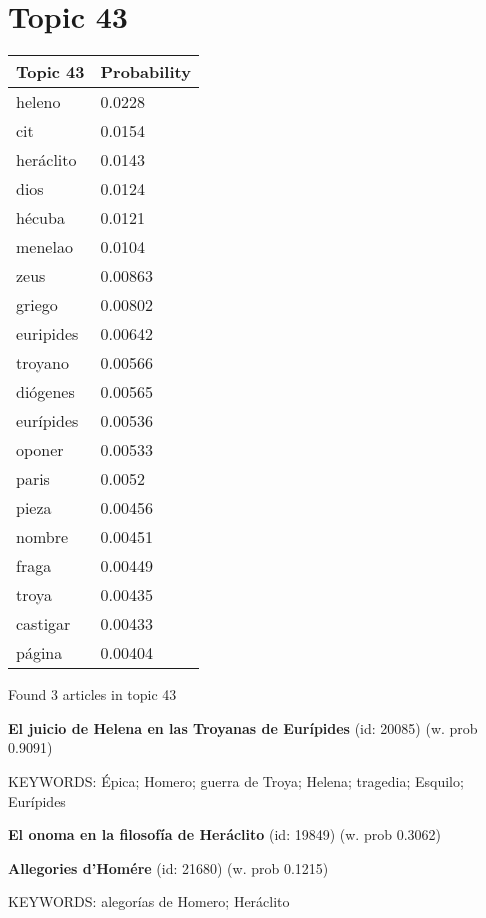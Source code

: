 \documentclass{article}
\begin{document}
\vfill
\newpage


\centering
\thispagestyle{empty}
\section*{Topic 43}\vfill
\begin{tabular}{ll}
\toprule
  Topic 43 & Probability \\
\midrule
    heleno &      0.0228 \\
       cit &      0.0154 \\
 heráclito &      0.0143 \\
      dios &      0.0124 \\
    hécuba &      0.0121 \\
   menelao &      0.0104 \\
      zeus &     0.00863 \\
    griego &     0.00802 \\
 euripides &     0.00642 \\
   troyano &     0.00566 \\
  diógenes &     0.00565 \\
 eurípides &     0.00536 \\
    oponer &     0.00533 \\
     paris &      0.0052 \\
     pieza &     0.00456 \\
    nombre &     0.00451 \\
     fraga &     0.00449 \\
     troya &     0.00435 \\
  castigar &     0.00433 \\
    página &     0.00404 \\
\bottomrule
\end{tabular}

\vfill
Found 3 articles in topic 43
\vfill

\textbf{El juicio de Helena en las Troyanas de Eurípides} (id: 20085)
 (w. prob 0.9091)


KEYWORDS:
Épica; Homero; guerra de Troya; Helena; tragedia; Esquilo; Eurípides
\vfill

\textbf{El onoma en la filosofía de Heráclito} (id: 19849)
 (w. prob 0.3062)
\vfill

\textbf{Allegories d'Homére} (id: 21680)
 (w. prob 0.1215)


KEYWORDS:
alegorías de Homero; Heráclito

\vfill
\newpage


\centering
\thispagestyle{empty}
\end{document}
